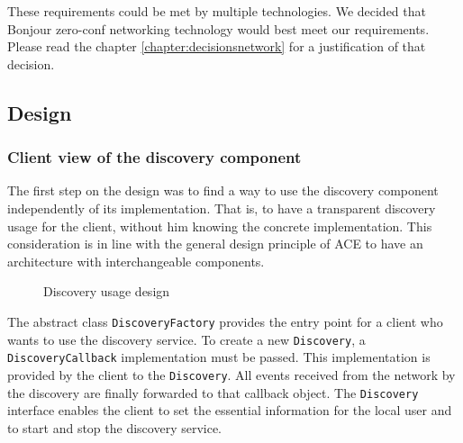 These requirements could be met by multiple technologies. We decided that Bonjour zero-conf networking technology would best meet our requirements. Please read the chapter \ref{chapter:decisionsnetwork} for a justification of that decision.

\subsection{Design}
\subsubsection{Client view of the discovery component}
The first step on the design was to find a way to use the discovery component independently of its implementation. That is, to have a transparent discovery usage for the client, without him knowing the concrete implementation. This consideration is in line with the general design principle of ACE to have an architecture with interchangeable components.

\begin{figure}[H]
 \centering
 \caption{Discovery usage design}
 \label{fig:network.discovery.usage}
\end{figure}

The abstract class  \texttt{DiscoveryFactory} provides the entry point for a client who wants to use the discovery service. To create a new  \texttt{Discovery}, a  \texttt{DiscoveryCallback} implementation must be passed. This implementation is provided by the client to the \texttt{Discovery}. All events received from the network by the discovery are finally forwarded to that callback object. The  \texttt{Discovery} interface enables the client to set the  essential information for the local user and to start and stop the discovery service.


